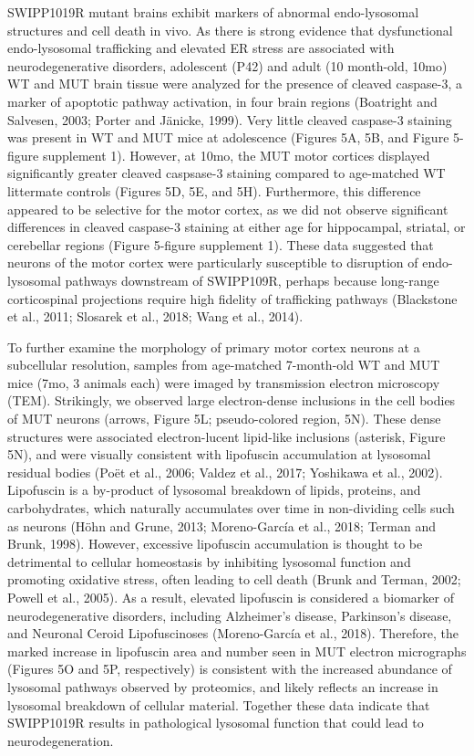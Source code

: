 SWIPP1019R mutant brains exhibit markers of abnormal endo-lysosomal structures
and cell death in vivo. As there is strong evidence that dysfunctional
endo-lysosomal trafficking and elevated ER stress are associated with
neurodegenerative disorders, adolescent (P42) and adult (10 month-old, 10mo) WT
and MUT brain tissue were analyzed for the presence of cleaved caspase-3, a
marker of apoptotic pathway activation, in four brain regions (Boatright and
Salvesen, 2003; Porter and Jänicke, 1999). Very little cleaved caspase-3
staining was present in WT and MUT mice at adolescence (Figures 5A, 5B, and
Figure 5-figure supplement 1). However, at 10mo, the MUT motor cortices
displayed significantly greater cleaved caspsase-3 staining compared to
age-matched WT littermate controls (Figures 5D, 5E, and 5H). Furthermore, this
difference appeared to be selective for the motor cortex, as we did not observe
significant differences in cleaved caspase-3 staining at either age for
hippocampal, striatal, or cerebellar regions (Figure 5-figure supplement 1).
These data suggested that neurons of the motor cortex were particularly
susceptible to disruption of endo-lysosomal pathways downstream of SWIPP109R,
perhaps because long-range corticospinal projections require high fidelity of
trafficking pathways (Blackstone et al., 2011; Slosarek et al., 2018; Wang et
al., 2014). 

To further examine the morphology of primary motor cortex neurons at a
subcellular resolution, samples from age-matched 7-month-old WT and MUT mice
(7mo, 3 animals each) were imaged by transmission electron microscopy (TEM).
Strikingly, we observed large electron-dense inclusions in the cell bodies of
MUT neurons (arrows, Figure 5L; pseudo-colored region, 5N). These dense
structures were associated electron-lucent lipid-like inclusions (asterisk,
Figure 5N), and were visually consistent with lipofuscin accumulation at
lysosomal residual bodies (Poët et al., 2006; Valdez et al., 2017; Yoshikawa et
al., 2002). Lipofuscin is a by-product of lysosomal breakdown of lipids,
proteins, and carbohydrates, which naturally accumulates over time in
non-dividing cells such as neurons (Höhn and Grune, 2013; Moreno-García et al.,
2018; Terman and Brunk, 1998). However, excessive lipofuscin accumulation is
thought to be detrimental to cellular homeostasis by inhibiting lysosomal
function and promoting oxidative stress, often leading to cell death (Brunk and
Terman, 2002; Powell et al., 2005). As a result, elevated lipofuscin is
considered a biomarker of neurodegenerative disorders, including Alzheimer’s
disease, Parkinson’s disease, and Neuronal Ceroid Lipofuscinoses (Moreno-García
et al., 2018). Therefore, the marked increase in lipofuscin area and number seen
in MUT electron micrographs (Figures 5O and 5P, respectively) is consistent with
the increased abundance of lysosomal pathways observed by proteomics, and likely
reflects an increase in lysosomal breakdown of cellular material. Together these
data indicate that SWIPP1019R results in pathological lysosomal function that
could lead to neurodegeneration. 

